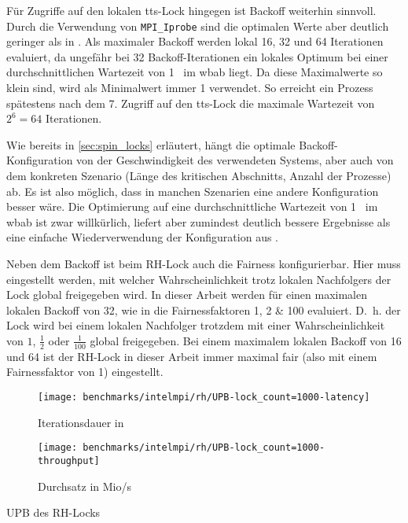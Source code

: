 Für Zugriffe auf den lokalen \gls{tts}-Lock hingegen ist Backoff weiterhin sinnvoll.
Durch die Verwendung von \texttt{MPI\_Iprobe}
sind die optimalen Werte aber deutlich geringer
als in \cite{RH-Lock}.
Als maximaler Backoff werden lokal 16, 32 und 64 Iterationen evaluiert,
da ungefähr bei 32 Backoff-Iterationen ein lokales Optimum
bei einer durchschnittlichen Wartezeit von 1~ im \gls{wbab} liegt.
Da diese Maximalwerte so klein sind,
wird als Minimalwert immer 1 verwendet.
So erreicht ein Prozess spätestens nach dem 7. Zugriff auf den \gls{tts}-Lock die maximale Wartezeit von $2^6 = 64$ Iterationen.

Wie bereits in \autoref{sec:spin_locks} erläutert,
hängt die optimale Backoff-Konfiguration von der Geschwindigkeit des verwendeten Systems,
aber auch von dem konkreten Szenario (Länge des kritischen Abschnitts, Anzahl der Prozesse) ab.
Es ist also möglich,
dass in manchen Szenarien eine andere Konfiguration besser wäre.
Die Optimierung auf eine durchschnittliche Wartezeit von 1~ im \gls{wbab} ist zwar willkürlich,
liefert aber zumindest deutlich bessere Ergebnisse
als eine einfache Wiederverwendung der Konfiguration aus \cite{RH-Lock}.

Neben dem Backoff ist beim RH-Lock auch die Fairness konfigurierbar.
Hier muss eingestellt werden,
mit welcher Wahrscheinlichkeit trotz lokalen Nachfolgers der Lock global freigegeben wird.
In dieser Arbeit werden für einen maximalen lokalen Backoff von 32,
wie in \cite{RH-Lock} die Fairnessfaktoren 1, 2 \& 100 evaluiert.
D.~h. der Lock wird bei einem lokalen Nachfolger trotzdem mit einer Wahrscheinlichkeit von $1$, $\frac{1}{2}$ oder $\frac{1}{100}$ global freigegeben.
Bei einem maximalem lokalen Backoff von 16 und 64 ist der RH-Lock in dieser Arbeit immer maximal fair (also mit einem Fairnessfaktor von 1) eingestellt.

\begin{benchmark}[h]
    \begin{subfigure}{.5\textwidth}
        \texttt{[image: benchmarks/intelmpi/rh/UPB-lock\_count=1000-latency]}
        \caption{Iterationsdauer in }
        \label{ben:rh_upb_latency}
    \end{subfigure}
    \begin{subfigure}{.5\textwidth}
        \texttt{[image: benchmarks/intelmpi/rh/UPB-lock\_count=1000-throughput]}
        \caption{Durchsatz in Mio/s}
        \label{ben:rh_upb_throughput}
    \end{subfigure}
    \caption{UPB des RH-Locks}
    \label{ben:rh_upb}
\end{benchmark}

